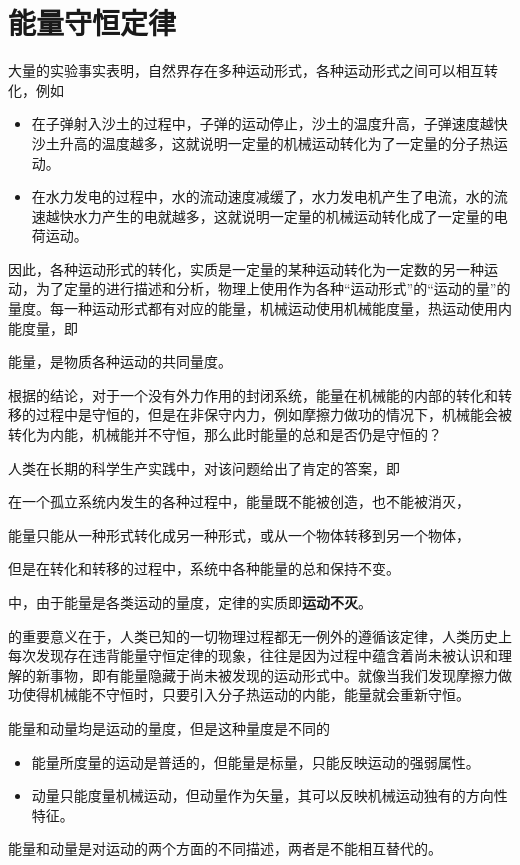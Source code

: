 \section{能量守恒定律}
大量的实验事实表明，自然界存在多种运动形式，各种运动形式之间可以相互转化，例如
\begin{itemize}
    \item 在子弹射入沙土的过程中，子弹的运动停止，沙土的温度升高，子弹速度越快沙土升高的温度越多，这就说明一定量的机械运动转化为了一定量的分子热运动。
    \item 在水力发电的过程中，水的流动速度减缓了，水力发电机产生了电流，水的流速越快水力产生的电就越多，这就说明一定量的机械运动转化成了一定量的电荷运动。
\end{itemize}
因此，各种运动形式的转化，实质是一定量的某种运动转化为一定数的另一种运动，为了定量的进行描述和分析，物理上使用作为各种“运动形式”的“运动的量”的量度。每一种运动形式都有对应的能量，机械运动使用机械能度量，热运动使用内能度量，即
\begin{center}
    能量，是物质各种运动的共同量度。
\end{center}
根据的结论，对于一个没有外力作用的封闭系统，能量在机械能的内部的转化和转移的过程中是守恒的，但是在非保守内力，例如摩擦力做功的情况下，机械能会被转化为内能，机械能并不守恒，那么此时能量的总和是否仍是守恒的？

人类在长期的科学生产实践中，对该问题给出了肯定的答案，即
\begin{BoxPrinciple}[能量守恒定律]
    在一个孤立系统内发生的各种过程中，能量既不能被创造，也不能被消灭，

    能量只能从一种形式转化成另一种形式，或从一个物体转移到另一个物体，
    
    但是在转化和转移的过程中，系统中各种能量的总和保持不变。
\end{BoxPrinciple}
中，由于能量是各类运动的量度，定律的实质即\textbf{运动不灭}。

的重要意义在于，人类已知的一切物理过程都无一例外的遵循该定律，人类历史上每次发现存在违背能量守恒定律的现象，往往是因为过程中蕴含着尚未被认识和理解的新事物，即有能量隐藏于尚未被发现的运动形式中。就像当我们发现摩擦力做功使得机械能不守恒时，只要引入分子热运动的内能，能量就会重新守恒。

能量和动量均是运动的量度，但是这种量度是不同的
\begin{itemize}
    \item 能量所度量的运动是普适的，但能量是标量，只能反映运动的强弱属性。
    \item 动量只能度量机械运动，但动量作为矢量，其可以反映机械运动独有的方向性特征。
\end{itemize}
能量和动量是对运动的两个方面的不同描述，两者是不能相互替代的。